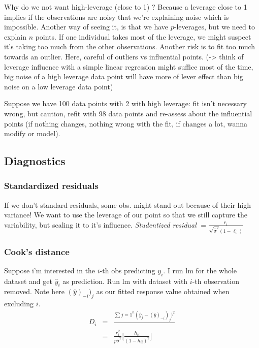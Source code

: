 \documentclass[
]{article}
\begin{document}
Why do we not want high-leverage (close to 1) ? Because a leverage close
to 1 implies if the observations are noisy that we're explaining noise
which is impossible. Another way of seeing it, is that we have
\(p\)-leverages, but we need to explain \(n\) points. If one individual
takes most of the leverage, we might suspect it's taking too much from
the other observations. Another risk is to fit too much towards an
outlier. Here, careful of outliers vs influential points.
(-\textgreater{} think of leverage influence with a simple linear
regression might suffice most of the time, big noise of a high leverage
data point will have more of lever effect than big noise on a low
leverage data point)

Suppose we have 100 data points with 2 with high leverage: fit isn't
necessary wrong, but caution, refit with 98 data points and re-assess
about the influential points (if nothing changes, nothing wrong with the
fit, if changes a lot, wanna modify or model).

\hypertarget{diagnostics}{%
\subsection{Diagnostics}\label{diagnostics}}

\hypertarget{standardized-residuals}{%
\subsubsection{Standardized residuals}\label{standardized-residuals}}

If we don't standard residuals, some obs. might stand out because of
their high variance! We want to use the leverage of our point so that we
still capture the variability, but scaling it to it's influence.
\emph{Studentized residual}
\(=\frac{r_i}{\sqrt{\hat{\sigma}^2}(1-\ell_i)}\)

\hypertarget{cooks-distance}{%
\subsubsection{Cook's distance}\label{cooks-distance}}

Suppose i'm interested in the \(i\)-th obs predicting \(y_i\). I run lm
for the whole dataset and get \(\hat{y}_i\) as prediction. Run lm with
dataset with \(i\)-th observation removed. Note here
\((\hat{y})_{-i})_j\) as our fitted response value obtained when
excluding \(i\). \begin{eqnarray*}
D_i &=&\frac{\sum{j=1}^n(\hat{y}_j-(\hat{y})_{-i})_j)^2}{}\\
&=&\frac{r_i^2}{p\hat{\sigma}^2}\big[\frac{h_{ii}}{(1-h_{ii})^2}\big]
\end{eqnarray*}
\end{document}
